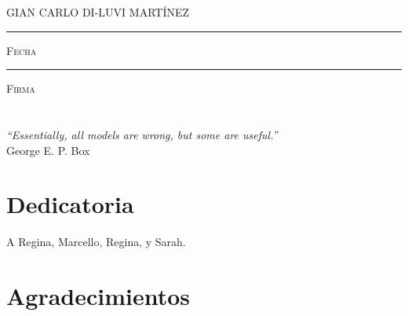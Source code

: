 \documentclass[11pt]{book}
\begin{document}
\centering

\hspace{3em}

\textsc{GIAN CARLO DI-LUVI MARTÍNEZ}

\vspace{5em}

\rule[1em]{20em}{0.5pt} %

\textsc{Fecha}
 
\vspace{8em}

\rule[1em]{20em}{0.5pt} %

\textsc{Firma}

\endgroup
\vspace*{\fill}




\frontmatter

\chapter*{}

\vspace{2cm}
\begin{flushright}
\textit{``Essentially, all models are wrong, but some are useful.''}\\
George E. P. Box
\end{flushright}






\chapter*{Dedicatoria}


A Regina, Marcello, Regina, y Sarah.








\chapter*{Agradecimientos}
\end{document}

